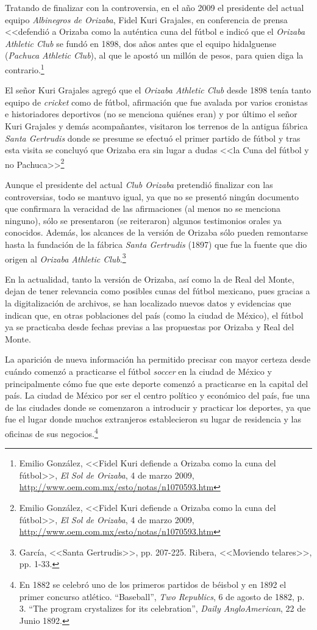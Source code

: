 \documentclass[11pt,a5paper,twoside]{book} %
\begin{document}
Tratando de finalizar con la controversia, en el año 2009 el presidente del actual
equipo \emph{Albinegros de Orizaba}, Fidel Kuri Grajales, en conferencia de prensa <<defendió a Orizaba como la auténtica cuna del fútbol e indicó que el \emph{Orizaba Athletic Club} se fundó en 1898, dos años antes que el equipo hidalguense (\emph{Pachuca Athletic Club}), al que le apostó un millón de pesos, para quien diga la contrario.\footnote{Emilio González, <<Fidel Kuri defiende a Orizaba como la cuna del fútbol>>, \emph{El Sol de Orizaba}, 4 de marzo 2009, \url{http://www.oem.com.mx/esto/notas/n1070593.htm}}

El señor Kuri Grajales agregó que el \emph{Orizaba Athletic Club} desde 1898 tenía tanto
equipo de \emph{cricket} como de fútbol, afirmación que fue avalada por varios cronistas e
historiadores deportivos (no se menciona quiénes eran) y por último el señor Kuri Grajales y
demás acompañantes, visitaron los terrenos de la antigua fábrica \emph{Santa Gertrudis} donde se presume se efectuó el primer partido de fútbol y tras esta visita se concluyó que Orizaba era sin lugar a dudas <<la Cuna del fútbol y no Pachuca>>\footnote{Emilio González, <<Fidel Kuri defiende a Orizaba como la cuna del fútbol>>, \emph{El Sol de Orizaba}, 4 de marzo 2009, \url{http://www.oem.com.mx/esto/notas/n1070593.htm}}

Aunque el presidente del actual \emph{Club Orizaba} pretendió finalizar con las
controversias, todo se mantuvo igual, ya que no se presentó ningún documento que
confirmara la veracidad de las afirmaciones (al menos no se menciona ninguno), sólo se
presentaron (se reiteraron) algunos testimonios orales ya conocidos. Además, los alcances de
la versión de Orizaba sólo pueden remontarse hasta la fundación de la fábrica \emph{Santa Gertrudis}
(1897) que fue la fuente que dio origen al \emph{Orizaba Athletic Club}.\footnote{García, <<Santa Gertrudis>>, pp. 207-225. Ribera, <<Moviendo telares>>, pp. 1-33.}

En la actualidad, tanto la versión de Orizaba, así como la de Real del Monte, dejan de
tener relevancia como posibles cunas del fútbol mexicano, pues gracias a la digitalización de
archivos, se han localizado nuevos datos y evidencias que indican que, en otras poblaciones
del país (como la ciudad de México), el fútbol ya se practicaba desde fechas previas a las
propuestas por Orizaba y Real del Monte.

La aparición de nueva información ha permitido precisar con mayor certeza desde
cuándo comenzó a practicarse el fútbol \emph{soccer} en la ciudad de México y principalmente cómo
fue que este deporte comenzó a practicarse en la capital del país. La ciudad de México por
ser el centro político y económico del país, fue una de las ciudades donde se comenzaron a
introducir y practicar los deportes, ya que fue el lugar donde muchos extranjeros
establecieron su lugar de residencia y las oficinas de sus negocios.\footnote{En 1882 se celebró uno de los primeros partidos de béisbol y en 1892 el primer concurso atlético. ``Baseball'', \emph{Two Republics}, 6 de agosto de 1882, p. 3. ``The program crystalizes for its celebration'', \emph{Daily AngloAmerican}, 22 de Junio 1892.}
\end{document}
